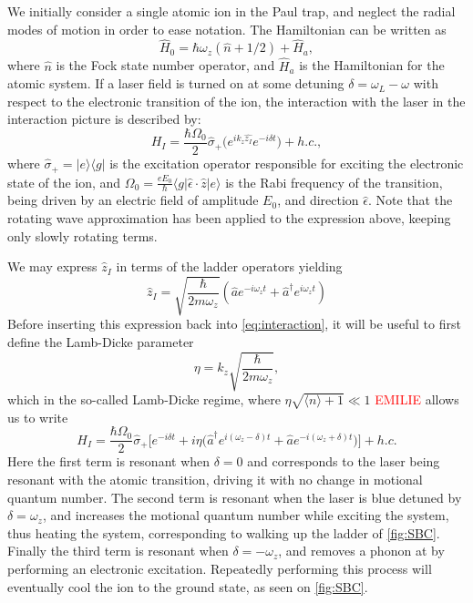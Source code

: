 We initially consider a single atomic ion in the Paul trap, and neglect the radial modes of motion in order to ease notation. The Hamiltonian can be written as
\begin{equation}
    \hat{H}_0 = \hbar\omega_{z}(\hat{n}+1/2)+\hat{H}_a,
\end{equation}
where $\hat{n}$ is the Fock state number operator, and $\hat{H}_a$ is the Hamiltonian for the atomic system. If a laser field is turned on at some detuning $\delta = \omega_L -\omega$ with respect to the electronic transition of the ion, the interaction with the laser in the interaction picture is described by:
\begin{equation}
    H_{I} = \frac{\hbar\Omega_0}{2}\hat{\sigma}_+\big(e^{ik_z\hat{z_I}}e^{-i\delta t}\big) + h.c.,
    \label{eq:interaction}
\end{equation}
where $\hat{\sigma}_+ = \vert e \rangle \langle g \vert$ is the excitation operator responsible for exciting the electronic state of the ion, and $\Omega_0 = \frac{eE_0}{\hbar}\langle g \vert \hat{\epsilon}\cdot\hat{z}\vert e\rangle$ is the Rabi frequency of the transition, being driven by an electric field of amplitude $E_0$, and direction $\hat{\epsilon}$. Note that the rotating wave approximation has been applied to the expression above, keeping only slowly rotating terms.

We may express $\hat{z}_I$ in terms of the ladder operators yielding
\begin{equation}
    \hat{z}_I = \sqrt{\frac{\hbar}{2m\omega_z}}(\hat{a}e^{-i\omega_z t}+\hat{a}^\dagger e^{i\omega_z t})
\end{equation}
Before inserting this expression back into \cref{eq:interaction}, it will be useful to first define the Lamb-Dicke parameter
\begin{equation}
    \eta = k_z\sqrt{\frac{\hbar}{2m\omega_z}},
\end{equation}
which in the so-called Lamb-Dicke regime, where $\eta\sqrt{\langle n \rangle +1} \ll 1$ \textcolor{red}{EMILIE} allows us to write
\begin{equation}
    H_I = \frac{\hbar\Omega_0}{2}\hat{\sigma}_+\bigg[e^{-i\delta t} + i\eta\big(\hat{a}^\dagger e^{i(\omega_z -\delta)t}+\hat{a}e^{-i(\omega_z+\delta)t}\big)\bigg] + h.c.
\end{equation}
Here the first term is resonant when $\delta = 0$ and corresponds to the laser being resonant with the atomic transition, driving it with no change in motional quantum number. The second term is resonant when the laser is blue detuned by  $\delta = \omega_z$, and increases the motional quantum number while exciting the system, thus heating the system, corresponding to walking up the ladder of \cref{fig:SBC}.
Finally the third term is resonant when $\delta = -\omega_z$, and removes a phonon at by performing an electronic excitation. Repeatedly performing this process will eventually cool the ion to the ground state, as seen on \cref{fig:SBC}.

